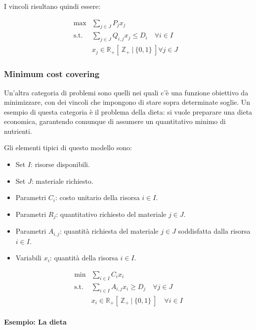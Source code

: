 I vincoli risultano quindi essere:

\begin{align*}
	\max &\sum\limits_{j \in J} P_j x_j &\\
	\text{s.t. } &\sum\limits_{j \in J} Q_{i,j} x_j \leq D_i \quad \forall i \in I \\
	&x_j \in \mathbb{R}_{+} [\: \mathbb{Z}_{+} \:|\: \{0,1\} \:] \forall j \in J
\end{align*}

\subsubsection{Minimum cost covering}

Un'altra categoria di problemi sono quelli nei quali c'è una funzione obiettivo da minimizzare, con dei vincoli che impongono di stare sopra determinate soglie.
Un esempio di questa categoria è il problema della dieta: si vuole preparare una dieta economica, garantendo comunque di assumere un quantitativo minimo di nutrienti.

Gli elementi tipici di questo modello sono:

\begin{itemize}
	\item Set $I$: risorse disponibili.
	\item Set $J$: materiale richiesto.
	\item Parametri $C_i$: costo unitario della risorsa $i \in I$.
	\item Parametri $R_j$: quantitativo richiesto del materiale $j \in J$.
	\item Parametri $A_{i,j}$: quantità richiesta del materiale $j \in J$ soddisfatta dalla risorsa $i \in I$.
	\item Variabili $x_i$: quantità della risorsa $i \in I$.
\end{itemize}

\begin{align*}
	\min &\sum\limits_{i \in I} C_i x_i \\
	\text{s.t. }& \sum\limits_{i \in I} A_{i,j} x_i \geq D_j \quad\forall j \in J \\
	&x_i \in \mathbb{R}_+ [\:\mathbb{Z}_+ \:|\: \{0,1\}\:] \quad \forall i \in I
\end{align*}

\paragraph{Esempio: La dieta}

